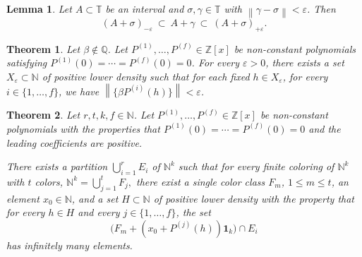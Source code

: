 \documentclass[10pt,a4paper]{amsart}
\newtheorem{theorem}{Theorem}
\newtheorem{lemma}{Lemma}
\def\Q{\mathbb{Q}}
\newcommand{\T}{\mathbb T}
\def\Z{{\mathbb  Z}}
\newcommand{\nnorm}[1]{\left\|#1\right\|}
\begin{document}
\begin{lemma}\label{lm2.3}
Let $A\subset\T$ be an interval and $\sigma,\gamma\in\T$ with $\nnorm{\gamma-\sigma}<\varepsilon$. Then
\[
(A+\sigma)_{-\varepsilon}\ \subset\ A+\gamma\ \subset\ (A+\sigma)_{+\varepsilon}.
\]
\end{lemma}

\begin{theorem}\label{lm2.2'}
Let $\beta \notin \Q$. Let $P^{(1)},\dots,P^{(f)}\in\Z[x]$ be non-constant polynomials satisfying $P^{(1)}(0)=\cdots=P^{(f)}(0)=0$. For every $\varepsilon>0$, there exists a set $X_{\varepsilon}\subset \mathbb{N}$ of positive lower density such that for each fixed $h\in X_{\varepsilon}$,  for every $i\in \{1,\dots,f\}$, we have $\nnorm{\{\beta P^{(i)}(h)\}}<\varepsilon$. 
\end{theorem}

\begin{theorem}\label{thmpolynomial-main}
Let $r, t, k, f\in \mathbb{N}$.
Let $P^{(1)},\dots,P^{(f)}\in\Z[x]$ be non-constant polynomials with the properties that $P^{(1)}(0)=\cdots=P^{(f)}(0)=0$ and the leading coefficients are positive. 

There exists a partition
$\bigcup_{i=1}^rE_i$ of $\mathbb{N}^k$ such that for every finite coloring of $\mathbb{N}^k$ with $t$ colors,
$
\mathbb{N}^k = \bigcup_{j=1}^t F_j,
$ there exist a single color class $F_m$, $1\le m\le t$, an element $x_0\in \mathbb{N}$, and a set $H\subset\mathbb{N}$ of positive lower density with the property that for every $h\in H$ and every $j\in\{1,\dots,f\}$, the set
\[
\big(F_m+(x_0+P^{(j)}(h))\mathbf{1}_k\big)\cap E_i
\]
has infinitely many elements.
\end{theorem}
\end{document}
